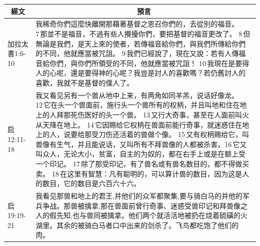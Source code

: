 \begin{table}[H]
\centering
\begin{tabular}{p{}|p{}}\hline\hline
\multicolumn{1}{c|}{經文}&\multicolumn{1}{c}{預言}\\\hline

加拉太書1:6-10&我稀奇你們這麼快離開那藉著基督之恩召你們的，去從別的福音。 7 那並不是福音，不過有些人攪擾你們，要把基督的福音更改了。 8 但無論是我們，是天上來的使者，若傳福音給你們，與我們所傳給你們的不同，他就應當被咒詛。 9 我們已經說了，現在又說：若有人傳福音給你們，與你們所領受的不同，他就應當被咒詛！ 10 我現在是要得人的心呢，還是要得神的心呢？我豈是討人的喜歡嗎？若仍舊討人的喜歡，我就不是基督的僕人了。\\\hline  

启12:11-18&我又看见另有一个兽从地中上来，有两角如同羊羔，说话好像龙。 12 它在头一个兽面前，施行头一个兽所有的权柄，并且叫地和住在地上的人拜那死伤医好的头一个兽。 13 又行大奇事，甚至在人面前叫火从天降在地上。 14 它因赐给它权柄在兽面前能行奇事，就迷惑住在地上的人，说要给那受刀伤还活着的兽做个像。 15 又有权柄赐给它，叫兽像有生气，并且能说话，又叫所有不拜兽像的人都被杀害。16 它又叫众人，无论大小，贫富，自主的为奴的，都在右手上或是在额上受一个印记。 17 除了那受印记，有了兽名或有兽名数目的，都不得做买卖。 18 在这里有智慧：凡有聪明的，可以算计兽的数目，因为这是人的数目，它的数目是六百六十六。 \\\hline

启19:19-21&我看见那兽和地上的君王,并他们的众军都聚集,要与骑白马的并他的军兵争战。那兽被擒拿,那在兽面前曾行奇事、迷惑受兽印记和拜兽像之人的假先知,也与兽同被擒拿。他们两个就活活地被扔在烧着硫磺的火湖里。其余的被骑白马者口中出来的剑杀了。飞鸟都吃饱了他们的肉。 \\\hline  

\end{tabular}
\end{table}


